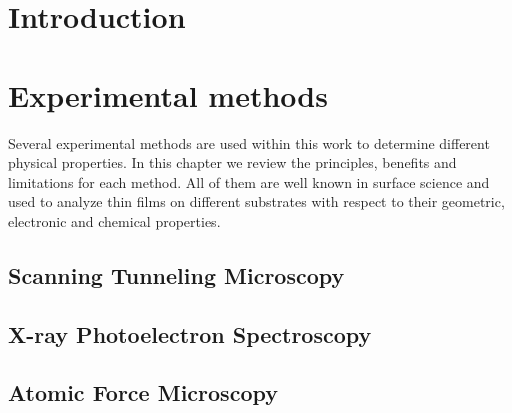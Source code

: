 \documentclass[
twoside,				%
BCOR=8mm,				%
headings=normal,		%
headsepline,			%
footsepline,			%
plainfootsepline,		%
]{scrbook}
\begin{document}

 \frontmatter{}			 														%
 \setcounter{tocdepth}{2}														%
	\tableofcontents{}														 	%
%
\mainmatter{}
\chapter{Introduction}


\chapter{Experimental methods}
Several experimental methods are used within this work to determine different physical properties. In this chapter we review the principles, benefits and limitations for each method. All of them are well known in surface science and used to analyze thin films on different substrates with respect to their geometric, electronic and chemical properties.

  \section{\textbf{S}canning \textbf{T}unneling \textbf{M}icroscopy}
    
  \section{\textbf{X}-ray \textbf{P}hotoelectron \textbf{S}pectroscopy}
	
  \section{\textbf{A}tomic \textbf{F}orce \textbf{M}icroscopy}
	
\end{document}
